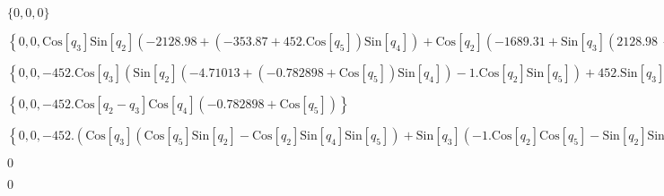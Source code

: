 \documentclass{article}
\begin{document}
\begin{doublespace}
\noindent\(\{0,0,0\}\)
\end{doublespace}

\begin{doublespace}
\noindent\(\left\{0,0,\text{Cos}\left[q_3\right] \text{Sin}\left[q_2\right] \left(-2128.98+\left(-353.87+452. \text{Cos}\left[q_5\right]\right) \text{Sin}\left[q_4\right]\right)+\text{Cos}\left[q_2\right]
\left(-1689.31+\text{Sin}\left[q_3\right] \left(2128.98\, +\left(353.87\, -452. \text{Cos}\left[q_5\right]\right) \text{Sin}\left[q_4\right]\right)\right)-452.
\text{Cos}\left[q_2-q_3\right] \text{Sin}\left[q_5\right]\right\}\)
\end{doublespace}

\begin{doublespace}
\noindent\(\left\{0,0,-452. \text{Cos}\left[q_3\right] \left(\text{Sin}\left[q_2\right] \left(-4.71013+\left(-0.782898+\text{Cos}\left[q_5\right]\right)
\text{Sin}\left[q_4\right]\right)-1. \text{Cos}\left[q_2\right] \text{Sin}\left[q_5\right]\right)+452. \text{Sin}\left[q_3\right] \left(\text{Cos}\left[q_2\right]
\left(-4.71013+\left(-0.782898+\text{Cos}\left[q_5\right]\right) \text{Sin}\left[q_4\right]\right)+\text{Sin}\left[q_2\right] \text{Sin}\left[q_5\right]\right)\right\}\)
\end{doublespace}

\begin{doublespace}
\noindent\(\left\{0,0,-452. \text{Cos}\left[q_2-q_3\right] \text{Cos}\left[q_4\right] \left(-0.782898+\text{Cos}\left[q_5\right]\right)\right\}\)
\end{doublespace}

\begin{doublespace}
\noindent\(\left\{0,0,-452. \left(\text{Cos}\left[q_3\right] \left(\text{Cos}\left[q_5\right] \text{Sin}\left[q_2\right]-\text{Cos}\left[q_2\right]
\text{Sin}\left[q_4\right] \text{Sin}\left[q_5\right]\right)+\text{Sin}\left[q_3\right] \left(-1. \text{Cos}\left[q_2\right] \text{Cos}\left[q_5\right]-\text{Sin}\left[q_2\right]
\text{Sin}\left[q_4\right] \text{Sin}\left[q_5\right]\right)\right)\right\}\)
\end{doublespace}

\begin{doublespace}
\noindent\(0\)
\end{doublespace}

\begin{doublespace}
\noindent\(0\)
\end{doublespace}
\end{document}
